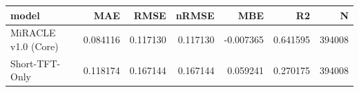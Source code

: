 \begin{tabular}{lrrrrrr}
\toprule
model & MAE & RMSE & nRMSE & MBE & R2 & N \\
\midrule
MiRACLE v1.0 (Core) & 0.084116 & 0.117130 & 0.117130 & -0.007365 & 0.641595 & 394008 \\
Short-TFT-Only & 0.118174 & 0.167144 & 0.167144 & 0.059241 & 0.270175 & 394008 \\
\bottomrule
\end{tabular}
